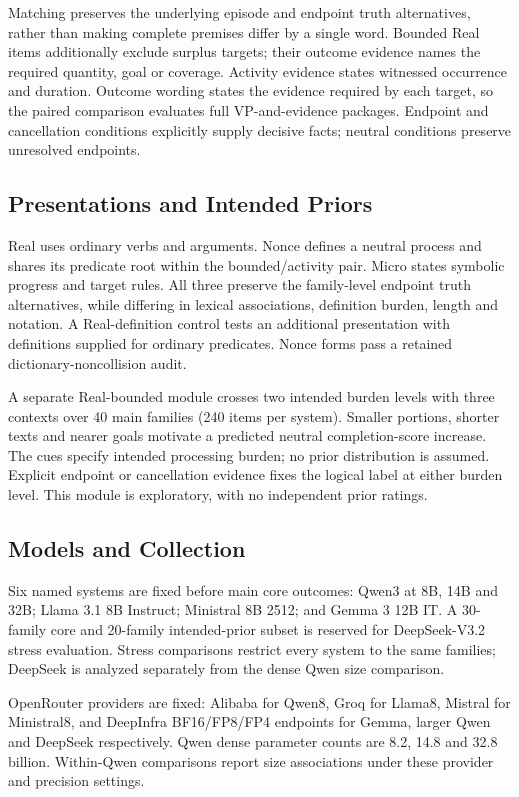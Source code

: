 \documentclass[sigconf,anonymous,review]{acmart}
\begin{document}
Matching preserves the underlying episode and endpoint truth alternatives, rather than making complete premises differ by a single word. Bounded Real items additionally exclude surplus targets; their outcome evidence names the required quantity, goal or coverage. Activity evidence states witnessed occurrence and duration. Outcome wording states the evidence required by each target, so the paired comparison evaluates full VP-and-evidence packages. Endpoint and cancellation conditions explicitly supply decisive facts; neutral conditions preserve unresolved endpoints.

\subsection{Presentations and Intended Priors}
Real uses ordinary verbs and arguments. Nonce defines a neutral process and shares its predicate root within the bounded/activity pair. Micro states symbolic progress and target rules. All three preserve the family-level endpoint truth alternatives, while differing in lexical associations, definition burden, length and notation. A Real-definition control tests an additional presentation with definitions supplied for ordinary predicates. Nonce forms pass a retained dictionary-noncollision audit.

A separate Real-bounded module crosses two intended burden levels with three contexts over 40 main families (240 items per system). Smaller portions, shorter texts and nearer goals motivate a predicted neutral completion-score increase. The cues specify intended processing burden; no prior distribution is assumed. Explicit endpoint or cancellation evidence fixes the logical label at either burden level. This module is exploratory, with no independent prior ratings.

\subsection{Models and Collection}
Six named systems are fixed before main core outcomes: Qwen3 at 8B, 14B and 32B; Llama 3.1 8B Instruct; Ministral 8B 2512; and Gemma 3 12B IT. A 30-family core and 20-family intended-prior subset is reserved for DeepSeek-V3.2 stress evaluation. Stress comparisons restrict every system to the same families; DeepSeek is analyzed separately from the dense Qwen size comparison.

OpenRouter providers are fixed: Alibaba for Qwen8, Groq for Llama8, Mistral for Ministral8, and DeepInfra BF16/FP8/FP4 endpoints for Gemma, larger Qwen and DeepSeek respectively. Qwen dense parameter counts are 8.2, 14.8 and 32.8 billion. Within-Qwen comparisons report size associations under these provider and precision settings.
\end{document}
